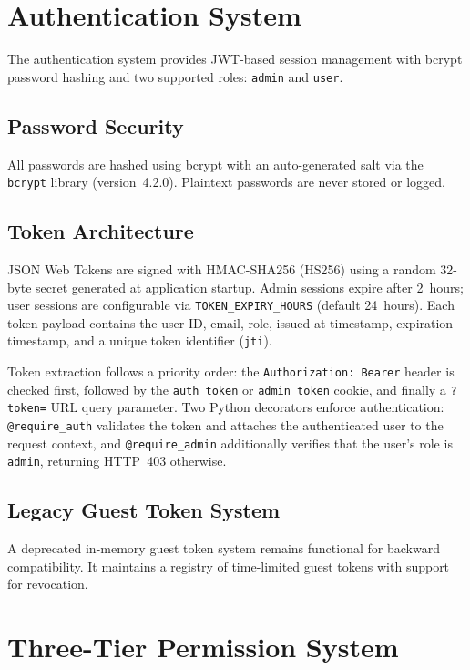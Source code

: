 \documentclass[12pt,letterpaper]{report}
\begin{document}
\section{Authentication System}

The authentication system provides JWT-based session management with bcrypt password hashing and two supported roles: \texttt{admin} and \texttt{user}.

\subsection{Password Security}

All passwords are hashed using bcrypt with an auto-generated salt via the \texttt{bcrypt} library (version~4.2.0). Plaintext passwords are never stored or logged.

\subsection{Token Architecture}

JSON Web Tokens are signed with HMAC-SHA256 (HS256) using a random 32-byte secret generated at application startup. Admin sessions expire after 2~hours; user sessions are configurable via \texttt{TOKEN\_EXPIRY\_HOURS} (default 24~hours). Each token payload contains the user ID, email, role, issued-at timestamp, expiration timestamp, and a unique token identifier (\texttt{jti}).

Token extraction follows a priority order: the \texttt{Authorization: Bearer} header is checked first, followed by the \texttt{auth\_token} or \texttt{admin\_token} cookie, and finally a \texttt{?token=} URL query parameter. Two Python decorators enforce authentication: \texttt{@require\_auth} validates the token and attaches the authenticated user to the request context, and \texttt{@require\_admin} additionally verifies that the user's role is \texttt{admin}, returning HTTP~403 otherwise.

\subsection{Legacy Guest Token System}

A deprecated in-memory guest token system remains functional for backward compatibility. It maintains a registry of time-limited guest tokens with support for revocation.

\section{Three-Tier Permission System}
\end{document}
